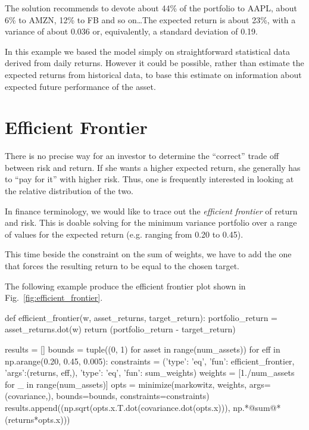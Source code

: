 The solution recommends to devote about 44\% of the portfolio to AAPL, about 6\% to AMZN, 12\% to FB and so on\ldots The expected return is about 23\%, with a variance of about 0.036 or, equivalently, a standard deviation of 0.19.

In this example we based the model simply on straightforward statistical data derived from daily returns. However it could be possible, rather than estimate the expected returns from historical data, to base this estimate on information about expected future performance of the asset.

\section{Efficient Frontier}\label{efficient-frontier}
There is no precise way for an investor to determine the “correct” trade off between risk and return. If she wants a higher expected return, she generally has to “pay for it” with higher risk. Thus, one is frequently interested in looking at the relative distribution of the two.

In finance terminology, we would like to trace out the \emph{efficient frontier} of return and risk. This is doable solving for the minimum variance portfolio over a range of values for the expected return (e.g. ranging from 0.20 to 0.45).

This time beside the constraint on the sum of weights, we have to add the one that forces the resulting return to be equal to the chosen target.

The following example produce the efficient frontier plot shown in Fig.~\ref{fig:efficient_frontier}.

\begin{ipython}
def efficient_frontier(w, asset_returns, target_return):
    portfolio_return = asset_returns.dot(w)
    return (portfolio_return - target_return)

results = []
bounds = tuple((0, 1) for asset in range(num_assets))
for eff in np.arange(0.20, 0.45, 0.005):
    constraints = ({'type': 'eq', 'fun': efficient_frontier,
                    'args':(returns, eff,)},
                   {'type': 'eq', 'fun': sum_weights})
weights = [1./num_assets for _ in range(num_assets)]
opts = minimize(markowitz, weights, args=(covariance,),
                bounds=bounds, constraints=constraints)
results.append((np.sqrt(opts.x.T.dot(covariance.dot(opts.x))),
                np.*@sum@*(returns*opts.x)))
\end{ipython}

